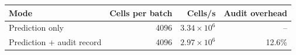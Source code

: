 \begin{tabular}{lrrr}
\toprule
Mode & Cells per batch & Cells/s & Audit overhead \\
\midrule
Prediction only & 4096 & $3.34\times10^{6}$ & -- \\
Prediction + audit record & 4096 & $2.97\times10^{6}$ & 12.6\% \\
\bottomrule
\end{tabular}
